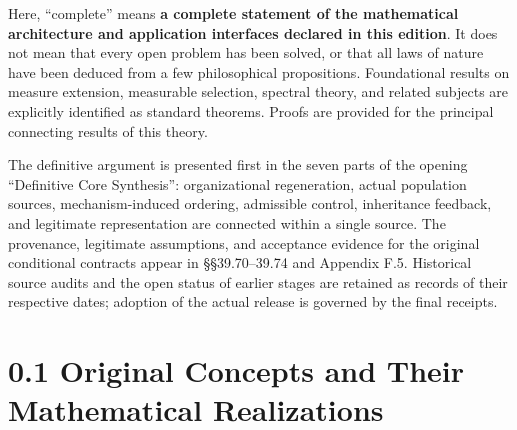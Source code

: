\documentclass[
  english,
  11pt,
  oneside]{book}
\begin{document}
Here, ``complete'' means \textbf{a complete statement of the mathematical architecture and application interfaces declared in this edition}. It does not mean that every open problem has been solved, or that all laws of nature have been deduced from a few philosophical propositions. Foundational results on measure extension, measurable selection, spectral theory, and related subjects are explicitly identified as standard theorems. Proofs are provided for the principal connecting results of this theory.

The definitive argument is presented first in the seven parts of the opening ``Definitive Core Synthesis'': organizational regeneration, actual population sources, mechanism-induced ordering, admissible control, inheritance feedback, and legitimate representation are connected within a single source. The provenance, legitimate assumptions, and acceptance evidence for the original conditional contracts appear in §§39.70--39.74 and Appendix F.5. Historical source audits and the open status of earlier stages are retained as records of their respective dates; adoption of the actual release is governed by the final receipts.

\section{0.1 Original Concepts and Their Mathematical Realizations}\label{original-concepts-and-their-mathematical-realizations}
\end{document}
